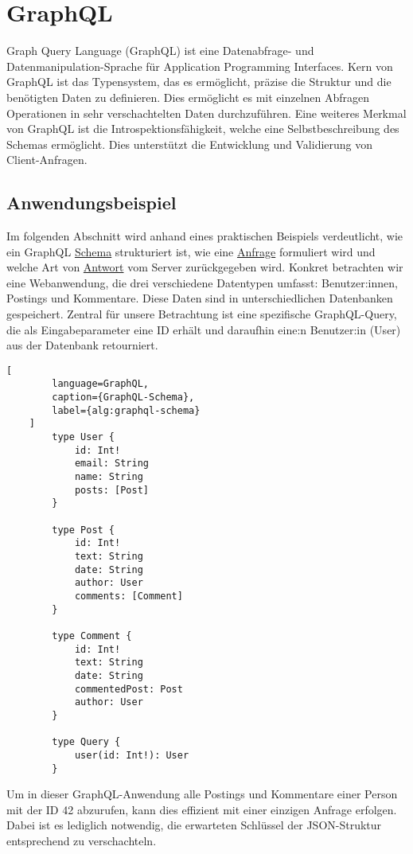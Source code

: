 \documentclass[draft,final]{vutinfth} %
\begin{document}
\section{GraphQL}

Graph Query Language (GraphQL) ist eine Datenabfrage- und Datenmanipulation-Sprache für Application Programming Interfaces. 
Kern von GraphQL ist das Typensystem, das es ermöglicht, präzise die Struktur und die benötigten Daten zu definieren. Dies ermöglicht es mit einzelnen Abfragen Operationen in sehr verschachtelten Daten durchzuführen.
Eine weiteres Merkmal von GraphQL ist die Introspektionsfähigkeit, welche eine Selbstbeschreibung des Schemas ermöglicht.
Dies unterstützt die Entwicklung und Validierung von Client-Anfragen.


\subsection{Anwendungsbeispiel}

Im folgenden Abschnitt wird anhand eines praktischen Beispiels verdeutlicht, wie ein GraphQL  \hyperref[alg:graphql-schema]{Schema} strukturiert ist, wie eine \hyperref[alg:graphql-request]{Anfrage} formuliert wird und welche Art von \hyperref[alg:graphql-response]{Antwort} vom Server zurückgegeben wird. 
Konkret betrachten wir eine Webanwendung, die drei verschiedene Datentypen umfasst: Benutzer:innen, Postings und Kommentare. 
Diese Daten sind in unterschiedlichen Datenbanken gespeichert. 
Zentral für unsere Betrachtung ist eine spezifische GraphQL-Query, die als Eingabeparameter eine ID erhält und daraufhin eine:n Benutzer:in (User) aus der Datenbank retourniert.

\begin{lstlisting}[
		language=GraphQL, 
		caption={GraphQL-Schema}, 
		label={alg:graphql-schema}
	]
		type User {
			id: Int!
			email: String
			name: String
			posts: [Post]
		}
		
		type Post {
			id: Int!
			text: String
			date: String
			author: User
			comments: [Comment]
		}
		
		type Comment {
			id: Int!
			text: String
			date: String
			commentedPost: Post
			author: User
		}
		
		type Query {
			user(id: Int!): User
		}
\end{lstlisting}

Um in dieser GraphQL-Anwendung alle Postings und Kommentare einer Person mit der ID 42 abzurufen, kann dies effizient mit einer einzigen Anfrage erfolgen. 
Dabei ist es lediglich notwendig, die erwarteten Schlüssel der JSON-Struktur entsprechend zu verschachteln.
\end{document}
